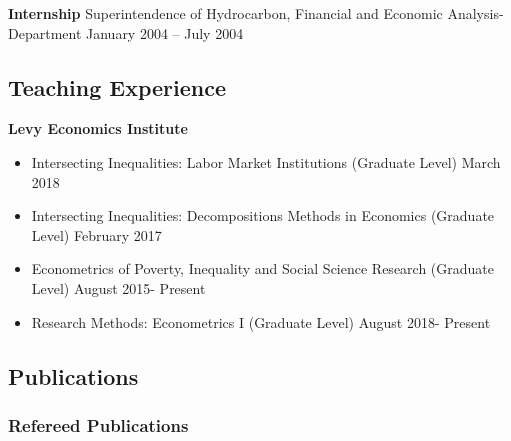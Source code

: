\documentclass[
  letterpaper,
]{moderncv}
\providecommand{\tightlist}{%
  \setlength{\itemsep}{0pt}\setlength{\parskip}{0pt}}\usepackage{longtable,booktabs,array}
\begin{document}
\textbf{Internship} \textbar{} Superintendence of Hydrocarbon, Financial
and Economic Analysis-Department \textbar{} January 2004 -- July 2004

\subsection{Teaching Experience}\label{teaching-experience}

\textbf{Levy Economics Institute}

\begin{itemize}
\tightlist
\item
  Intersecting Inequalities: Labor Market Institutions (Graduate Level)
  \textbar{} March 2018
\item
  Intersecting Inequalities: Decompositions Methods in Economics
  (Graduate Level) \textbar{} February 2017
\item
  Econometrics of Poverty, Inequality and Social Science Research
  (Graduate Level) \textbar{} August 2015- Present
\item
  Research Methods: Econometrics I (Graduate Level) \textbar{} August
  2018- Present
\end{itemize}

\subsection{Publications}\label{publications}

\subsubsection{Refereed Publications}\label{refereed-publications}
\end{document}
